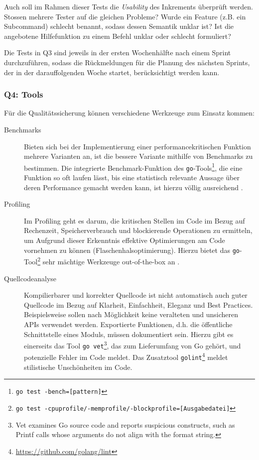 Auch soll im Rahmen dieser Tests die \textit{Usability} des Inkrements überprüft werden. Stossen mehrere Tester auf die gleichen Probleme? Wurde ein Feature (z.B. ein Subcommand) schlecht benannt, sodass dessen Semantik unklar ist? Ist die angebotene Hilfefunktion zu einem Befehl unklar oder schlecht formuliert?

Die Tests in Q3 sind jeweils in der ersten Wochenhälfte nach einem Sprint durchzuführen, sodass die Rückmeldungen für die Planung des nächsten Sprints, der in der darauffolgenden Woche startet, berücksichtigt werden kann.

\subsubsection{Q4: Tools}

Für die Qualitätssicherung können verschiedene Werkzeuge zum Einsatz kommen:

\begin{description}
	\item[Benchmarks] Bieten sich bei der Implementierung einer performancekritischen Funktion mehrere Varianten an, ist die bessere Variante mithilfe von Benchmarks zu bestimmen. Die integrierte Benchmark-Funktion des \texttt{go}-Tools\footnote{\texttt{go test -bench=[pattern]}}, die eine Funktion so oft laufen lässt, bis eine statistisch relevante Aussage über deren Performance gemacht werden kann, ist hierzu völlig ausreichend \cite[S. 321]{gopl}.
	\item[Profiling] Im Profiling geht es darum, die kritischen Stellen im Code im Bezug auf Rechenzeit, Speicherverbrauch und blockierende Operationen zu ermitteln, um Aufgrund dieser Erkenntnis effektive Optimierungen am Code vornehmen zu können (Flaschenhalsoptimierung). Hierzu bietet das \texttt{go}-Tool\footnote{\texttt{go test -cpuprofile/-memprofile/-blockprofile=[Ausgabedatei]}} sehr mächtige Werkzeuge out-of-the-box an \cite[S. 324]{gopl}.
	\item[Quellcodeanalyse] Kompilierbarer und korrekter Quellcode ist nicht automatisch auch guter Quellcode im Bezug auf Klarheit, Einfachheit, Eleganz und Best Practices. Beispielsweise sollen nach Möglichkeit keine veralteten und unsicheren APIs verwendet werden. Exportierte Funktionen, d.h. die öffentliche Schnittstelle eines Moduls, müssen dokumentiert sein. Hierzu gibt es einerseits das Tool \texttt{go vet}\footnote{Vet examines Go source code and reports suspicious constructs, such as Printf calls whose arguments do not align with the format string.}, das zum Lieferumfang von Go gehört, und potenzielle Fehler im Code meldet. Das Zusatztool \texttt{golint}\footnote{\url{https://github.com/golang/lint}} meldet stilistische Unschönheiten im Code.
\end{description}

